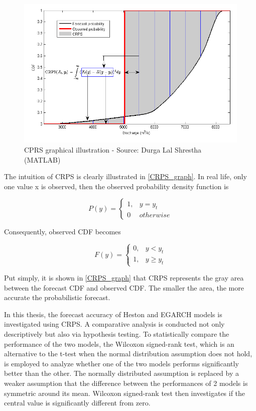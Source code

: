 \documentclass[12pt,a4paper]{article}
\newcommand\colorAutoref[1]{{\hypersetup{linkcolor=black}\autoref{#1}}}
\numberwithin{equation}{section}
\begin{document}
\begin{figure}[h!] 
\includegraphics[scale=1,width=1\linewidth,height=0.4\textheight]{CRPS_graphical.png}
\caption{CPRS graphical illustration - Source: Durga Lal Shrestha (MATLAB)}
\label{CRPS_graph}
\end{figure}

The intuition of CRPS is clearly illustrated in \colorAutoref{CRPS_graph}. In real life, only one value x is observed, then the observed probability density function is 

\begin{equation*}
P(y) = 
\begin{cases}
 1, & y = y_t \\
 0 & otherwise
\end{cases}
\end{equation*}

Consequently, observed CDF becomes

\begin{equation*}
F(y) = 
\begin{cases}
 0, & y < y_t \\
 1, & y \geq y_t
\end{cases}
\end{equation*}
 

Put simply, it is shown in \colorAutoref{CRPS_graph} that CRPS represents the gray area between the forecast CDF and observed CDF. The smaller the area, the more accurate the probabilistic forecast.

In this thesis, the forecast accuracy of Heston and EGARCH models is investigated using CRPS. A comparative analysis is conducted not only descriptively but also via hypothesis testing. To statistically compare the performance of the two models, the Wilcoxon signed-rank test, which is an alternative to the t-test when the normal distribution assumption does not hold, is employed to analyze whether one of the two models performs significantly better than the other. The normally distributed assumption is replaced by a weaker assumption that the difference between the performances of 2 models is symmetric around its mean. Wilcoxon signed-rank test then investigates if the central value is significantly different from zero.
\end{document}
